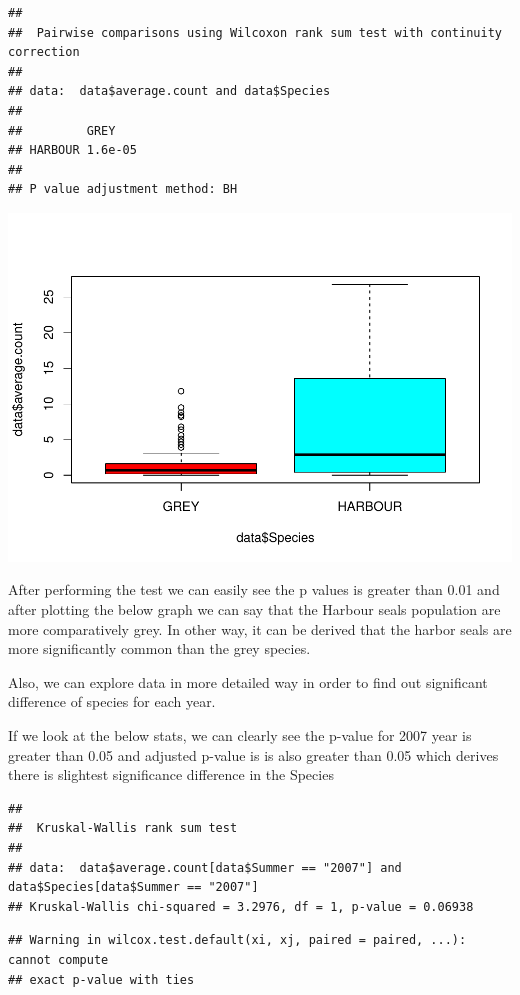 \documentclass[
]{article}
\begin{document}
\begin{verbatim}
## 
##  Pairwise comparisons using Wilcoxon rank sum test with continuity correction 
## 
## data:  data$average.count and data$Species 
## 
##         GREY   
## HARBOUR 1.6e-05
## 
## P value adjustment method: BH
\end{verbatim}

\includegraphics{Statistical-analysis-in-RStudio_files/figure-latex/unnamed-chunk-24-1.pdf}

After performing the test we can easily see the p values is greater than
0.01 and after plotting the below graph we can say that the Harbour
seals population are more comparatively grey. In other way, it can be
derived that the harbor seals are more significantly common than the
grey species.

Also, we can explore data in more detailed way in order to find out
significant difference of species for each year.

If we look at the below stats, we can clearly see the p-value for 2007
year is greater than 0.05 and adjusted p-value is is also greater than
0.05 which derives there is slightest significance difference in the
Species

\begin{verbatim}
## 
##  Kruskal-Wallis rank sum test
## 
## data:  data$average.count[data$Summer == "2007"] and data$Species[data$Summer == "2007"]
## Kruskal-Wallis chi-squared = 3.2976, df = 1, p-value = 0.06938
\end{verbatim}

\begin{verbatim}
## Warning in wilcox.test.default(xi, xj, paired = paired, ...): cannot compute
## exact p-value with ties
\end{verbatim}
\end{document}
